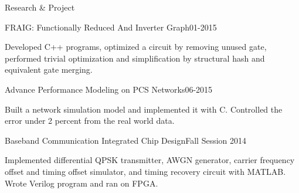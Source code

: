 \documentclass[letterpaper]{resume} %
\begin{document}

\begin{rSection}{Research \& Project}

\begin{rSubsection}{FRAIG: Functionally Reduced And Inverter Graph}{01-2015}{}{}
\item Developed C++ programs, optimized a circuit by removing unused gate, performed trivial optimization and simplification by structural hash and equivalent gate merging.
\end{rSubsection}
\vspace{-0.6\baselineskip}
\begin{rSubsection}{Advance Performance Modeling on PCS Networks}{06-2015}{}{}
\item Built a network simulation model and implemented it with C. Controlled the error under 2 percent from the real world data.
\end{rSubsection}
\vspace{-0.6\baselineskip}
\begin{rSubsection}{Baseband Communication Integrated Chip Design}{Fall Session 2014}{}{}
\item Implemented differential QPSK transmitter, AWGN generator, carrier frequency offset and timing offset simulator, and timing recovery circuit with MATLAB. Wrote Verilog program and ran on FPGA.\end{rSubsection}

\end{rSection}
\vspace{-0.6\baselineskip}

\end{document}
